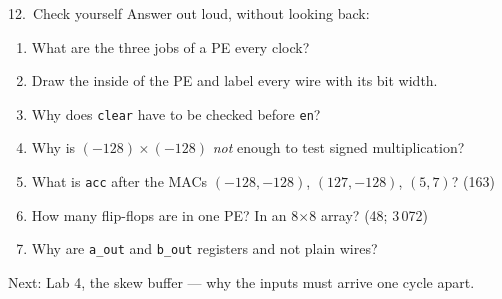 \documentclass[aspectratio=169,11pt]{beamer}
\newcommand{\sig}[1]{\texttt{#1}}
\begin{document}
\begin{frame}{12.\ Check yourself}
  \small
  Answer out loud, without looking back:
  \begin{enumerate}
    \item What are the three jobs of a PE every clock?
    \item Draw the inside of the PE and label every wire with its bit width.
    \item Why does \sig{clear} have to be checked before \sig{en}?
    \item Why is $(-128)\times(-128)$ \emph{not} enough to test signed multiplication?
    \item What is \sig{acc} after the MACs $(-128,-128)$, $(127,-128)$, $(5,7)$? \hfill (163)
    \item How many flip-flops are in one PE? In an 8$\times$8 array? \hfill (48; 3\,072)
    \item Why are \sig{a\_out} and \sig{b\_out} registers and not plain wires?
  \end{enumerate}
  \vspace{2mm}
  \footnotesize\color{muted} Next: Lab 4, the skew buffer --- why the inputs must arrive one cycle apart.
\end{frame}
\end{document}
